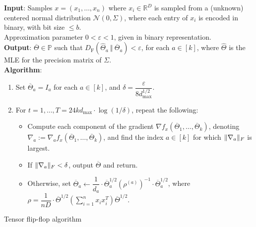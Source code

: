 \documentclass[aos]{imsart}
\theoremstyle{definition}
\numberwithin{equation}{section}
\DeclarePairedDelimiter{\norm}{\lVert}{\rVert}
\newcommand{\R}{{\mathbb{R}}}
\newcommand{\otheta}{\overline{\Theta}}
\newcommand{\htheta}{\widehat{\Theta}}
\newcommand{\eps}{\varepsilon}
\newcommand{\cN}{\mathcal{N}}
\newcommand{\SPD}{\mathbb{P}}
\newcommand{\samp}{x}
\newcommand{\DF}{D_{\operatorname{F}}}
\def\dmax{d_{\max}}
\begin{document}
\begin{Algorithm}
\textbf{Input}: Samples $\samp = (\samp_1, \ldots, \samp_n)$ where $\samp_i \in \R^D$ is sampled from a (unknown) centered normal distribution $\cN(0, \Sigma)$, where each entry of $\samp_i$ is encoded in binary, with bit size $\le b$. \\ Approximation parameter $0 < \eps < 1$, given in binary representation. \\[.3ex]

\textbf{Output}: $\otheta \in \SPD$ such that $\DF(\htheta_a \ \Vert  \ \otheta_a) < \eps$, for each $a \in [k]$, where $\htheta$ is the MLE for the precision matrix of $\Sigma$. \\[.3ex]

\textbf{Algorithm}:
\begin{enumerate}
\item\label{it:tensor-flip-flop step 1} Set $\otheta_a = I_a$ for each $a \in [k]$, and
$\delta = \dfrac{\eps}{8 \dmax^{1/2}}$.

\vspace{5pt}

\item\label{it:tensor-flip-flop step 2} For $t=1,\dots,T = 24 k \dmax \cdot \log(1/\delta)$, repeat the following:

\vspace{5pt}

\begin{itemize}
\item Compute each component of the gradient $\nabla f_{\samp}(\otheta_1, \ldots, \otheta_k)$, denoting $\nabla_a := \nabla_a f_{\samp}(\otheta_1, \ldots, \otheta_k)$, and find the index $a \in [k]$ for which $\norm{\nabla_a}_F$ is largest.

\vspace{5pt}

\item
If $\norm{\nabla_a}_F < \delta$, output $\otheta$ and return.

\vspace{5pt}

\item Otherwise, set $\otheta_a \leftarrow  \dfrac{1}{d_a} \cdot \otheta_a^{1/2} (\rho^{(a)})^{-1} \cdot \otheta_a^{1/2}$, where $\rho = \dfrac{1}{nD} \cdot \otheta^{1/2} \left( \sum_{i=1}^n x_ix_i^T \right) \otheta^{1/2}.$
\end{itemize}
\end{enumerate}
\caption{Tensor flip-flop algorithm}\label{alg:tensor-flip-flop}
\end{Algorithm}
\end{document}
